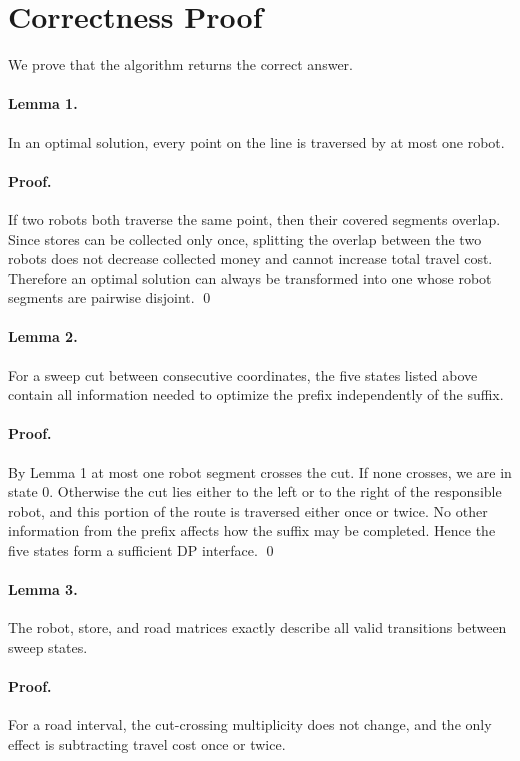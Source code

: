 \documentclass[11pt]{article}
\begin{document}
\section*{Correctness Proof}

We prove that the algorithm returns the correct answer.

\paragraph{Lemma 1.}
In an optimal solution, every point on the line is traversed by at most one robot.

\paragraph{Proof.}
If two robots both traverse the same point, then their covered segments overlap. Since stores can be collected only once, splitting the overlap between the two robots does not decrease collected money and cannot increase total travel cost. Therefore an optimal solution can always be transformed into one whose robot segments are pairwise disjoint. \qed

\paragraph{Lemma 2.}
For a sweep cut between consecutive coordinates, the five states listed above contain all information needed to optimize the prefix independently of the suffix.

\paragraph{Proof.}
By Lemma 1 at most one robot segment crosses the cut. If none crosses, we are in state $0$. Otherwise the cut lies either to the left or to the right of the responsible robot, and this portion of the route is traversed either once or twice. No other information from the prefix affects how the suffix may be completed. Hence the five states form a sufficient DP interface. \qed

\paragraph{Lemma 3.}
The robot, store, and road matrices exactly describe all valid transitions between sweep states.

\paragraph{Proof.}
For a road interval, the cut-crossing multiplicity does not change, and the only effect is subtracting travel cost once or twice.
\end{document}
